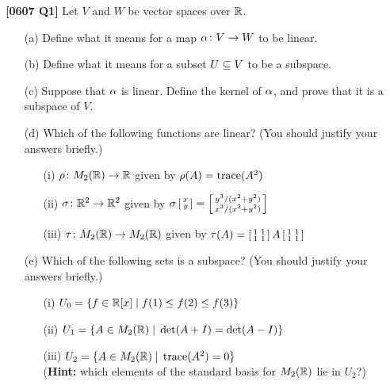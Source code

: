 \documentclass[a4paper]{article}
\begin{document}
\begin{problem}\textbf{[0607 Q1]}
 Let $V$ and $W$ be vector spaces over ${\mathbb{R}}$.
 \begin{itemize}
  \item[(a)] Define what it means for a map $\alpha\colon V\to W$ to be
   linear. 
  \item[(b)] Define what it means for a subset $U\subseteq V$ to be a
   subspace. 
  \item[(c)] Suppose that $\alpha$ is linear.  Define the kernel of
   $\alpha$, and prove that it is a subspace of $V$. 
  \item[(d)] Which of the following functions are linear?  (You should
   justify your answers briefly.) 
   \begin{itemize}
    \item[(i)] $\rho\colon M_2({\mathbb{R}})\to{\mathbb{R}}$ given by $\rho(A)=\operatorname{trace}(A^2)$
    \item[(ii)] $\sigma\colon{\mathbb{R}}^2\to{\mathbb{R}}^2$ given by 
     $\displaystyle \sigma\left[\begin{smallmatrix} x\\ y\end{smallmatrix}\right] =
      \left[\begin{smallmatrix} y^3/(x^2+y^2) \\ x^3/(x^2+y^2) \end{smallmatrix}\right]$
    \item[(iii)] $\tau\colon M_2({\mathbb{R}})\to M_2({\mathbb{R}})$ given by 
     $\displaystyle \tau(A)=
       \left[\begin{smallmatrix} 1&1 \\ 1&1\end{smallmatrix}\right] A \left[\begin{smallmatrix} 1&1 \\ 1&1\end{smallmatrix}\right]$
   \end{itemize}
  \item[(e)] Which of the following sets is a subspace?  (You should
   justify your answers briefly.) 
   \begin{itemize}
    \item[(i)] $U_0=\{f\in{\mathbb{R}}[x]\;|\; f(1)\leq f(2)\leq f(3)\}$
    \item[(ii)] $U_1=\{A\in M_2({\mathbb{R}})\;|\;\det(A+I)=\det(A-I)\}$
    \item[(iii)] $U_2=\{A\in M_2({\mathbb{R}})\;|\;\operatorname{trace}(A^2)=0\}$\\
     (\textbf{Hint:} which elements of the standard basis for
     $M_2({\mathbb{R}})$ lie in $U_2$?)
   \end{itemize}
 \end{itemize}
\end{problem}
\end{document}
